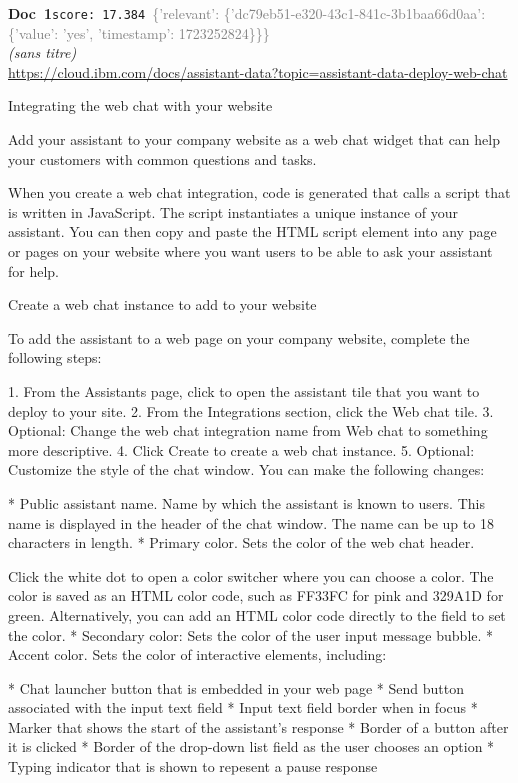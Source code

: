 \documentclass[a4paper,11pt]{article}
\begin{document}
\begin{docenv}
{\footnotesize\textcolor{doccolor}{\textbf{Doc~1}}}\hfill{\tiny\texttt{score:~17.384}}\ {\tiny\textcolor{gray}{\{'relevant': \{'dc79eb51-e320-43c1-841c-3b1baa66d0aa': \{'value': 'yes', 'timestamp': 1723252824\}\}\}}}\\[3pt]
{\small\textit{(sans titre)}}\\[2pt]
{\tiny\url{https://cloud.ibm.com/docs/assistant-data?topic=assistant-data-deploy-web-chat}}\\[4pt]
{\footnotesize 
Integrating the web chat with your website 

Add your assistant to your company website as a web chat widget that can help your customers with common questions and tasks.

When you create a web chat integration, code is generated that calls a script that is written in JavaScript. The script instantiates a unique instance of your assistant. You can then copy and paste the HTML script element into any page or pages on your website where you want users to be able to ask your assistant for help.



 Create a web chat instance to add to your website 

To add the assistant to a web page on your company website, complete the following steps:



1. From the Assistants page, click to open the assistant tile that you want to deploy to your site.
2. From the Integrations section, click the Web chat tile.
3. Optional: Change the web chat integration name from Web chat to something more descriptive.
4. Click Create to create a web chat instance.
5. Optional: Customize the style of the chat window. You can make the following changes:



* Public assistant name. Name by which the assistant is known to users. This name is displayed in the header of the chat window. The name can be up to 18 characters in length.
* Primary color. Sets the color of the web chat header.

Click the white dot to open a color switcher where you can choose a color. The color is saved as an HTML color code, such as FF33FC for pink and 329A1D for green. Alternatively, you can add an HTML color code directly to the field to set the color.
* Secondary color: Sets the color of the user input message bubble.
* Accent color. Sets the color of interactive elements, including:



* Chat launcher button that is embedded in your web page
* Send button associated with the input text field
* Input text field border when in focus
* Marker that shows the start of the assistant’s response
* Border of a button after it is clicked
* Border of the drop-down list field as the user chooses an option
* Typing indicator that is shown to repesent a pause response}
\end{docenv}
\end{document}
